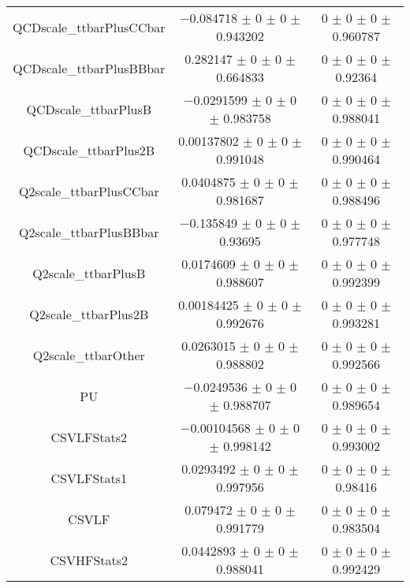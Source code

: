\begin{table}
\begin{tabular}{ccc}
QCDscale\_ttbarPlusCCbar & \num{-0.084718} $\pm$ \num{0} $\pm$ \num{0} $\pm$ \num{0.943202} & \num{0} $\pm$ \num{0} $\pm$ \num{0} $\pm$ \num{0.960787}\\
QCDscale\_ttbarPlusBBbar & \num{0.282147} $\pm$ \num{0} $\pm$ \num{0} $\pm$ \num{0.664833} & \num{0} $\pm$ \num{0} $\pm$ \num{0} $\pm$ \num{0.92364}\\
QCDscale\_ttbarPlusB & \num{-0.0291599} $\pm$ \num{0} $\pm$ \num{0} $\pm$ \num{0.983758} & \num{0} $\pm$ \num{0} $\pm$ \num{0} $\pm$ \num{0.988041}\\
QCDscale\_ttbarPlus2B & \num{0.00137802} $\pm$ \num{0} $\pm$ \num{0} $\pm$ \num{0.991048} & \num{0} $\pm$ \num{0} $\pm$ \num{0} $\pm$ \num{0.990464}\\
Q2scale\_ttbarPlusCCbar & \num{0.0404875} $\pm$ \num{0} $\pm$ \num{0} $\pm$ \num{0.981687} & \num{0} $\pm$ \num{0} $\pm$ \num{0} $\pm$ \num{0.988496}\\
Q2scale\_ttbarPlusBBbar & \num{-0.135849} $\pm$ \num{0} $\pm$ \num{0} $\pm$ \num{0.93695} & \num{0} $\pm$ \num{0} $\pm$ \num{0} $\pm$ \num{0.977748}\\
Q2scale\_ttbarPlusB & \num{0.0174609} $\pm$ \num{0} $\pm$ \num{0} $\pm$ \num{0.988607} & \num{0} $\pm$ \num{0} $\pm$ \num{0} $\pm$ \num{0.992399}\\
Q2scale\_ttbarPlus2B & \num{0.00184425} $\pm$ \num{0} $\pm$ \num{0} $\pm$ \num{0.992676} & \num{0} $\pm$ \num{0} $\pm$ \num{0} $\pm$ \num{0.993281}\\
Q2scale\_ttbarOther & \num{0.0263015} $\pm$ \num{0} $\pm$ \num{0} $\pm$ \num{0.988802} & \num{0} $\pm$ \num{0} $\pm$ \num{0} $\pm$ \num{0.992566}\\
PU & \num{-0.0249536} $\pm$ \num{0} $\pm$ \num{0} $\pm$ \num{0.988707} & \num{0} $\pm$ \num{0} $\pm$ \num{0} $\pm$ \num{0.989654}\\
CSVLFStats2 & \num{-0.00104568} $\pm$ \num{0} $\pm$ \num{0} $\pm$ \num{0.998142} & \num{0} $\pm$ \num{0} $\pm$ \num{0} $\pm$ \num{0.993002}\\
CSVLFStats1 & \num{0.0293492} $\pm$ \num{0} $\pm$ \num{0} $\pm$ \num{0.997956} & \num{0} $\pm$ \num{0} $\pm$ \num{0} $\pm$ \num{0.98416}\\
CSVLF & \num{0.079472} $\pm$ \num{0} $\pm$ \num{0} $\pm$ \num{0.991779} & \num{0} $\pm$ \num{0} $\pm$ \num{0} $\pm$ \num{0.983504}\\
CSVHFStats2 & \num{0.0442893} $\pm$ \num{0} $\pm$ \num{0} $\pm$ \num{0.988041} & \num{0} $\pm$ \num{0} $\pm$ \num{0} $\pm$ \num{0.992429}\\

\end{tabular}
\end{table}
